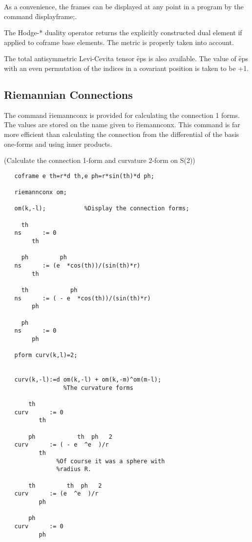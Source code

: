  
\hypertarget{command:DISPLAYFRAME}{}
As a convenience, the frames can be displayed at any point in a program
by the command \f{displayframe;}\label{DISPLAYFRAME}.

The Hodge-* duality operator returns the explicitly constructed dual
element if applied to coframe base elements. The metric is properly
taken into account.

 
The total antisymmetric Levi-Cevita tensor \f{eps}\label{EPS} is
also available.  The value of \f{eps} with an even permutation of the
indices in a covariant position is taken to be +1.


\subsection{Riemannian Connections}

The command \f{riemannconx} is provided for calculating the
 \label{RIEMANNCONX}
\hypertarget{command:RIEMANNCONX}{}
connection 1 forms.  The values are stored on the name given to
\f{riemannconx}.  This command is far more efficient than calculating the
connection from the differential of the basis one-forms and using
inner products.

\example (Calculate the connection 1-form and curvature 2-form on S(2))

\begin{verbatim}
   coframe e th=r*d th,e ph=r*sin(th)*d ph;

   riemannconx om;

   om(k,-l);           %Display the connection forms;

     th
   ns      := 0
        th

     ph         ph
   ns      := (e  *cos(th))/(sin(th)*r)
        th

     th            ph
   ns      := ( - e  *cos(th))/(sin(th)*r)
        ph

     ph
   ns      := 0
        ph

   pform curv(k,l)=2;


   curv(k,-l):=d om(k,-l) + om(k,-m)^om(m-l);
                 %The curvature forms

       th
   curv      := 0
          th

       ph            th  ph   2
   curv      := ( - e  ^e  )/r
          th
               %Of course it was a sphere with
               %radius R.

       th         th  ph   2
   curv      := (e  ^e  )/r
          ph

       ph
   curv      := 0
          ph
\end{verbatim}

